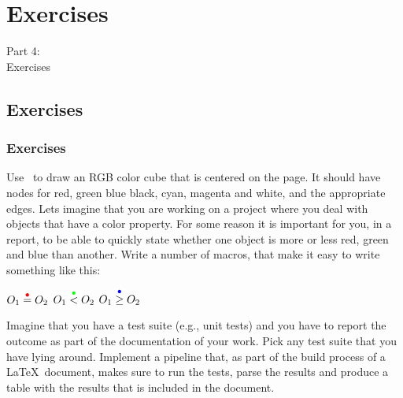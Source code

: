 {
\renewcommand{\bgcolor}{exercises}

\section{Exercises}
\begin{frame}
  \vspace{25mm}
  \begin{center}
    \Huge{Part 4:\\Exercises}
  \end{center}
\end{frame}

\subsection{Exercises}
\begin{frame}[fragile]
  \frametitle{Exercises}
  \vspace{1mm}
  \begin{enumerate}
     Use \TikZ\ to draw an RGB color cube that is centered on the page. It should have nodes for red, green blue black, cyan, magenta and white, and the appropriate edges.
     Lets imagine that you are working on a project where you deal with objects that have a color property. For some reason it is important for you, in a report, to be able to quickly state whether one object is more or less red, green and blue than another. Write a number of macros, that make it easy to write something like this:
      \begin{center}
        $O_1 \overset{\textcolor{red}{\bullet}}{=} O_2$
        \hspace{2cm}
        $O_1 \overset{\textcolor{green}{\bullet}}{<} O_2$
        \hspace{2cm}
        $O_1 \overset{\textcolor{blue}{\bullet}}{\geq} O_2$
      \end{center}
     Imagine that you have a test suite (e.g., unit tests) and you have to report the outcome as part of the documentation of your work. Pick any test suite that you have lying around. Implement a pipeline that, as part of the build process of a \LaTeX\ document, makes sure to run the tests, parse the results and produce a table with the results that is included in the document.
  \end{enumerate}
\end{frame}

}

